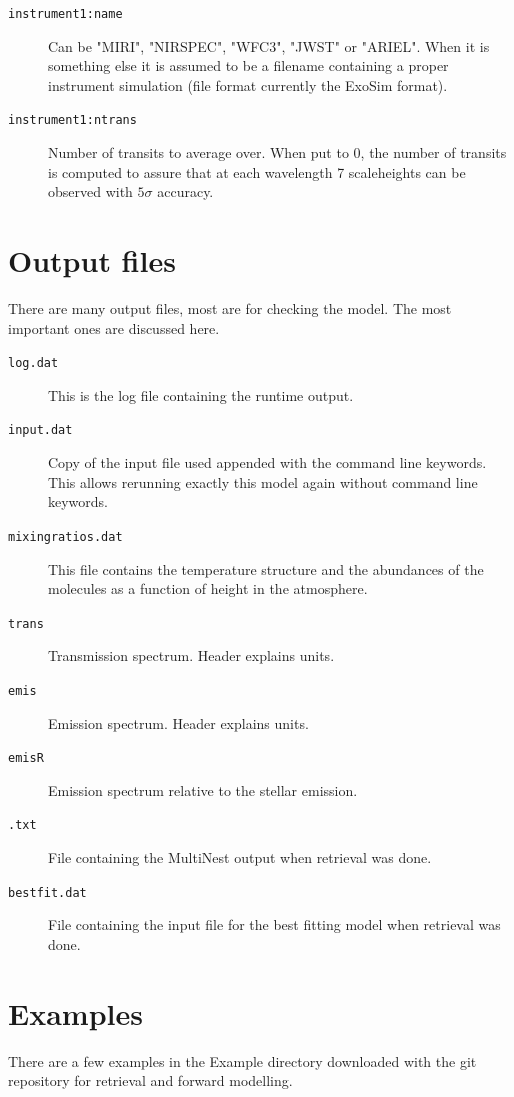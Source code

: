 \documentclass[12pt]{article}
\begin{document}
\begin{description}

\item[\texttt{instrument1:name}]
Can be "MIRI", "NIRSPEC", "WFC3", "JWST" or "ARIEL". When it is something else it is assumed to be a filename containing a proper instrument simulation (file format currently the ExoSim format).
\item[\texttt{instrument1:ntrans}]
Number of transits to average over. When put to $0$, the number of transits is computed to assure that at each wavelength 7 scaleheights can be observed with $5\sigma$ accuracy.
\end{description}

\section{Output files}

There are many output files, most are for checking the model. The most important ones are discussed here.

\begin{description}
\item[\texttt{log.dat}]
This is the log file containing the runtime output.
\item[\texttt{input.dat}]
Copy of the input file used appended with the command line keywords. This allows rerunning exactly this model again without command line keywords.
\item[\texttt{mixingratios.dat}]
This file contains the temperature structure and the abundances of the molecules as a function of height in the atmosphere.
\item[\texttt{trans}]
Transmission spectrum. Header explains units.
\item[\texttt{emis}]
Emission spectrum. Header explains units.
\item[\texttt{emisR}]
Emission spectrum relative to the stellar emission.
\item[\texttt{.txt}]
File containing the MultiNest output when retrieval was done.
\item[\texttt{bestfit.dat}]
File containing the input file for the best fitting model when retrieval was done.
\end{description}

\section{Examples}

There are a few examples in the Example directory downloaded with the git repository for retrieval and forward modelling.
\end{document}
